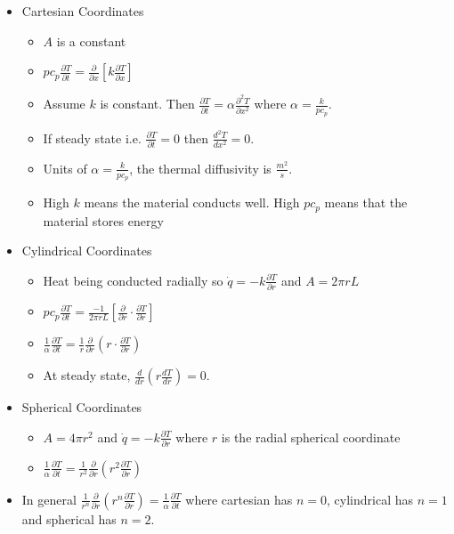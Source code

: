 \documentclass[12pt]{article}
\begin{document}
\begin{itemize}
    \item Cartesian Coordinates \begin{itemize}
        \item $A$ is a constant
        \item $p c_p \frac{\partial T}{\partial t} = \frac{\partial}{\partial x} [k \frac{\partial T}{\partial x}]$
        \item Assume $k$ is constant. Then $\frac{\partial T}{\partial t} = \alpha \frac{\partial^2 T}{\partial x^2}$ where $\alpha = \frac{k}{pc_p}$. 
        \item If steady state i.e. $\frac{\partial T}{\partial t} = 0$ then $\frac{d^2T}{d x^2} = 0$. 
        \item Units of $\alpha = \frac{k}{pc_p}$, the thermal diffusivity is $\frac{m^2}{s}$. 
        \item High $k$ means the material conducts well. High $pc_p$ means that the material stores energy
    \end{itemize}
    \item Cylindrical Coordinates \begin{itemize}
        \item Heat being conducted radially so $\dot{q} = - k \frac{\partial T}{\partial r}$ and $A = 2 \pi r L$
        \item $pc_p \frac{\partial T}{\partial t} = \frac{-1}{2 \pi r L} [\frac{\partial }{\partial r} \cdot \frac{\partial T}{\partial r}]$
        \item $\frac{1}{\alpha} \frac{\partial T}{\partial t} = \frac{1}{r} \frac{\partial }{\partial r}(r \cdot \frac{\partial T}{\partial r})$
        \item At steady state, $\frac{d}{dr} (r \frac{dT}{dr}) = 0$. 
    \end{itemize}
    \item Spherical Coordinates \begin{itemize}
        \item $A = 4 \pi r^2$ and $\dot{q} = -k \frac{\partial T}{\partial r}$ where $r$ is the radial spherical coordinate
        \item $\frac{1}{\alpha} \frac{\partial T}{\partial t} = \frac{1}{r^2} \frac{\partial}{\partial r}(r^2 \frac{\partial T}{\partial r})$
    \end{itemize}
    \item In general $\frac{1}{r^n} \frac{\partial}{\partial r} (r^n \frac{\partial T}{\partial r}) = \frac{1}{\alpha} \frac{\partial T}{\partial t}$ where 
    cartesian has $n = 0$, cylindrical has $n=1$ and spherical has $n = 2$. 
\end{itemize}
\end{document}
